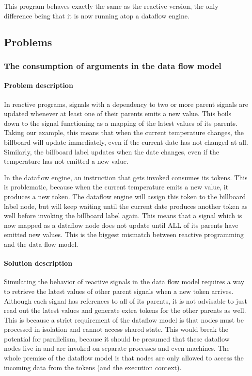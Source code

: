 This program behaves exactly the same as the reactive version, the only difference being that it is now running atop a dataflow engine.

\subsection{Problems}

\subsubsection{The consumption of arguments in the data flow model}

\paragraph{Problem description}

In reactive programs, signals with a dependency to two or more parent signals are updated whenever at least one of their parents emits a new value. This boils down to the signal functioning as a mapping of the latest values of its parents. Taking our example, this means that when the current temperature changes, the billboard will update immediately, even if the current date has not changed at all.
Similarly, the billboard label updates when the date changes, even if the temperature has not emitted a new value.

In the dataflow engine, an instruction that gets invoked consumes its tokens. This is problematic, because when the current temperature emits a new value, it produces a new token. 
The dataflow engine will assign this token to the billboard label node, but will keep waiting until the current date produces another token as well before invoking the billboard label again. This means that a signal which is now mapped as a dataflow node does not update until ALL of its parents have emitted new values. This is the biggest mismatch between reactive programming and the data flow model.

\paragraph{Solution description}

Simulating the behavior of reactive signals in the data flow model requires a way to retrieve the latest values of other parent signals when a new token arrives. 
Although each signal has references to all of its parents, it is not advisable to just read out the latest values and generate extra tokens for the other parents as well. This is because a strict requirement of the dataflow model is that nodes must be processed in isolation and cannot access shared state. 
This would break the potential for parallelism, because it should be presumed that these dataflow nodes live in and are invoked on separate processes and even machines. The whole premise of the dataflow model is that nodes are only allowed to access the incoming data from the tokens (and the execution context).

